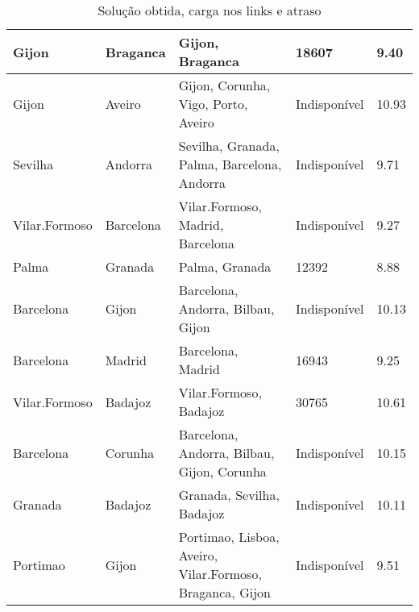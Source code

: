 \begin{table}[!htb]
{\begin{tabular}{|l|l|l|l|l|}
Gijon & Braganca & Gijon, Braganca & 18607 & 9.40 \\ \hline
Gijon & Aveiro & Gijon, Corunha, Vigo, Porto, Aveiro & Indisponível & 10.93 \\ \hline
Sevilha & Andorra & Sevilha, Granada, Palma, Barcelona, Andorra & Indisponível & 9.71 \\ \hline
Vilar.Formoso & Barcelona & Vilar.Formoso, Madrid, Barcelona & Indisponível & 9.27 \\ \hline
Palma & Granada & Palma, Granada & 12392 & 8.88 \\ \hline
Barcelona & Gijon & Barcelona, Andorra, Bilbau, Gijon & Indisponível & 10.13 \\ \hline
Barcelona & Madrid & Barcelona, Madrid & 16943 & 9.25 \\ \hline
Vilar.Formoso & Badajoz & Vilar.Formoso, Badajoz & 30765 & 10.61 \\ \hline
Barcelona & Corunha & Barcelona, Andorra, Bilbau, Gijon, Corunha & Indisponível & 10.15 \\ \hline
Granada & Badajoz & Granada, Sevilha, Badajoz & Indisponível & 10.11 \\ \hline
Portimao & Gijon & Portimao, Lisboa, Aveiro, Vilar.Formoso, Braganca, Gijon & Indisponível & 9.51 \\ \hline
\end{tabular}}
\caption[]{Solução obtida, carga nos links e atraso}
\end{table}

